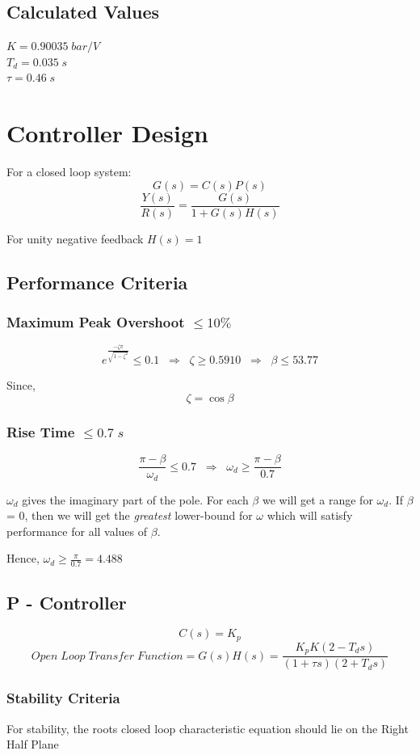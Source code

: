 \documentclass{article}
\begin{document}
\subsection{Calculated Values}
$K = 0.90035 \; bar/V$\\
$T_d = 0.035 \; s$\\
$\tau = 0.46 \; s$


\section{Controller Design}
For a closed loop system:
\[G(s) = C(s)P(s)\]
\[\frac{Y(s)}{R(s)} = \frac{G(s)}{1 + G(s)H(s)}\]

For unity negative feedback $H(s) = 1$

\subsection{Performance Criteria}
\subsubsection{Maximum Peak Overshoot $\leq 10 \%$}

\[e^{\frac{-\zeta \pi}{\sqrt{1 - \zeta^2}}} \leq 0.1 \;\; \Rightarrow \;\; \zeta \geq 0.5910 \;\; \Rightarrow \;\; \beta \leq 53.77\]

Since, 
\[ \zeta = \cos{\beta}\]

\subsubsection{Rise Time $\leq 0.7 \; s$}
\[\frac{\pi - \beta}{\omega_d} \leq 0.7 \;\; \Rightarrow \;\; \omega_d \geq \frac{\pi - \beta}{0.7}\]

$\omega_d$ gives the imaginary part of the pole. For each $\beta$ we will get a range for $\omega_d$. If $\beta$ = 0, then we will get the \textit{greatest} lower-bound for $\omega$ which will satisfy performance for all values of $\beta$.

Hence, $\omega_d \geq \frac{\pi}{0.7} = 4.488$

\subsection{P - Controller}

\[C(s) = K_p\]
\[Open \; Loop \; Transfer \; Function = G(s)H(s) = \frac{K_p K(2 - T_d s)}{(1 + \tau s)(2 + T_d s)}\]

\subsubsection{Stability Criteria}
For stability, the roots closed loop characteristic equation should lie on the Right Half Plane
\end{document}
